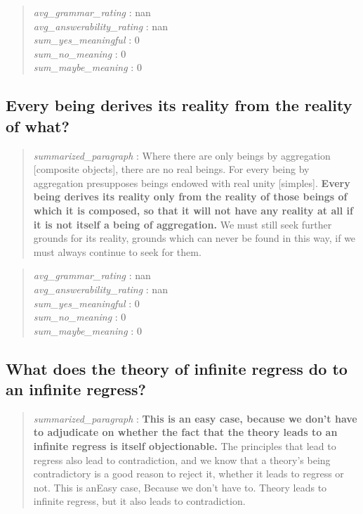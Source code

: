 \begin{quote}
\emph{avg\_grammar\_rating} : nan\\
\emph{avg\_answerability\_rating} : nan\\
\emph{sum\_yes\_meaningful} : 0\\
\emph{sum\_no\_meaning} : 0\\
\emph{sum\_maybe\_meaning} : 0
\end{quote}

\hypertarget{every-being-derives-its-reality-from-the-reality-of-what}{%
\subsection{Every being derives its reality from the reality of
what?}\label{every-being-derives-its-reality-from-the-reality-of-what}}

\begin{quote}
\emph{summarized\_paragraph} : Where there are only beings by
aggregation {[}composite objects{]}, there are no real beings. For every
being by aggregation presupposes beings endowed with real unity
{[}simples{]}. \textbf{Every being derives its reality only from the
reality of those beings of which it is composed, so that it will not
have any reality at all if it is not itself a being of aggregation.} We
must still seek further grounds for its reality, grounds which can never
be found in this way, if we must always continue to seek for them.
\end{quote}

\begin{quote}
\emph{avg\_grammar\_rating} : nan\\
\emph{avg\_answerability\_rating} : nan\\
\emph{sum\_yes\_meaningful} : 0\\
\emph{sum\_no\_meaning} : 0\\
\emph{sum\_maybe\_meaning} : 0
\end{quote}

\hypertarget{what-does-the-theory-of-infinite-regress-do-to-an-infinite-regress}{%
\subsection{What does the theory of infinite regress do to an infinite
regress?}\label{what-does-the-theory-of-infinite-regress-do-to-an-infinite-regress}}

\begin{quote}
\emph{summarized\_paragraph} : \textbf{This is an easy case, because we
don't have to adjudicate on whether the fact that the theory leads to an
infinite regress is itself objectionable.} The principles that lead to
regress also lead to contradiction, and we know that a theory's being
contradictory is a good reason to reject it, whether it leads to regress
or not. This is anEasy case, Because we don't have to. Theory leads to
infinite regress, but it also leads to contradiction.
\end{quote}


